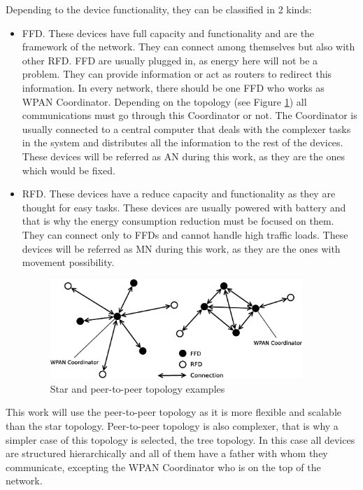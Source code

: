 Depending to the device functionality, they can be classified in 2 kinds:

\begin{itemize}
 \item \acl{FFD}. These devices have full capacity and functionality and are the framework of the network. They can connect 
among themselves but also with other \ac{RFD}. \ac{FFD} are usually plugged in, as energy here will not be a problem. They can provide 
information or act as routers to redirect this information. In every network, there should be one \ac{FFD} who works as \ac{WPAN}
Coordinator. Depending on the topology (see Figure \ref{fig:WPAN_Network_Topologies}) all communications must go through this 
Coordinator or not. The Coordinator is usually connected to a central computer that deals with the complexer tasks in the system 
and distributes all the information to the rest of the devices. These devices will be referred as \ac{AN} during this work, as they
are the ones which would be fixed.
 \item \acl{RFD}. These devices have a reduce capacity and functionality as they are thought for easy tasks. These devices are
usually powered with battery and that is why the energy consumption reduction must be focused on them. They can connect only
to \acp{FFD} and cannot handle high traffic loads. These devices will be referred as \ac{MN} during this work, as they are the ones with 
movement possibility.

\vspace*{1cm}

\begin{figure}[ht]
 \begin{center}
  \includegraphics[width=0.9\textwidth]{WPAN_Network_Topologies.eps}
 \end{center}
 \caption{Star and peer-to-peer topology examples \cite{IEEE802.15.4-2006}}
 \label{fig:WPAN_Network_Topologies}
\end{figure}
\end{itemize}
This work will use the peer-to-peer topology as it is more flexible and scalable than the star topology. Peer-to-peer topology is also
complexer, that is why a simpler case of this topology is selected, the tree topology. In this case all devices are
structured hierarchically and all of them have a father with whom they communicate, excepting the \ac{WPAN} Coordinator who is on the top of the network.

